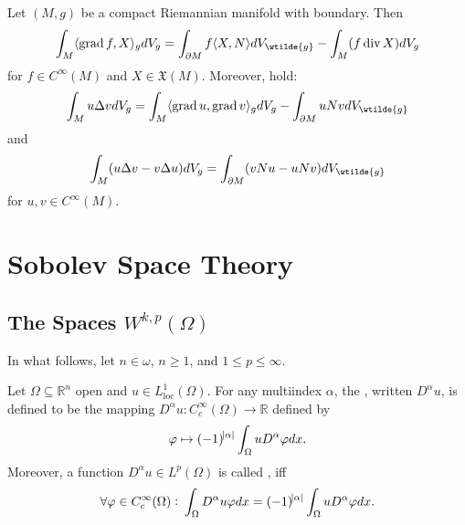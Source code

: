\begin{proposition}
	\label{prop:IP}
	Let $(M,g)$ be a compact Riemannian manifold with boundary. Then
	\begin{equation*}
		\int_M \langle \grad f,X \rangle_g dV_g = \int_{\partial M}f \langle X,N \rangle dV_{\wtilde{g}} - \int_M (f \div X) dV_g
	\end{equation*}
	\noindent for $f \in C^\infty(M)$ and $X \in \mathfrak{X}(M)$. Moreover,  hold:
	\begin{equation*}
		\int_M u\Delta v dV_g = \int_M \langle \grad u,\grad v\rangle_g dV_g - \int_{\partial M} uNv dV_{\wtilde{g}}
	\end{equation*}
	\noindent and
	\begin{equation*}
		\int_M (u\Delta v - v \Delta u)dV_g = \int_{\partial M}(vNu - u Nv)dV_{\wtilde{g}}
	\end{equation*}
	\noindent for $u,v \in C^\infty(M)$.
\end{proposition}

\section*{Sobolev Space Theory}
\subsection*{The Spaces $W^{k,p}(\Omega)$}
In what follows, let $n \in \omega$, $n \geq 1$, and $1 \leq p \leq \infty$.

\begin{definition}
	Let $\Omega \subseteq \mathbb{R}^n$ open and $u \in L^1_{\mathrm{loc}}(\Omega)$. For any multiindex $\alpha$, the , written $D^\alpha u$, is defined to be the mapping $D^\alpha u : C^\infty_c(\Omega) \to \mathbb{R}$ defined by
	\begin{equation*}
		\varphi \mapsto (-1)^{\abs{\alpha}}\int_\Omega u D^\alpha \varphi dx.
	\end{equation*}
	Moreover, a function $D^\alpha u \in L^p(\Omega)$ is called , iff
	\begin{equation*}
		\forall \varphi \in C^\infty_c(\Omega): \> \int_\Omega D^\alpha u \varphi dx =  (-1)^{\abs{\alpha}} \int_\Omega u D^\alpha \varphi dx.
	\end{equation*}
\end{definition}


